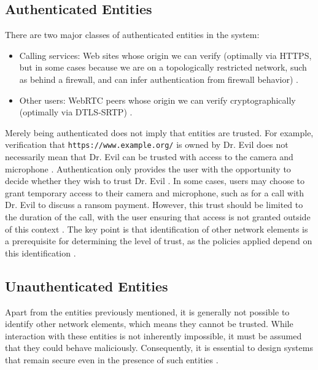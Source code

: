 \documentclass[conference]{IEEEtran}
\begin{document}
\subsection{Authenticated Entities}
There are two major classes of authenticated entities in the system:
\begin{itemize}
    \item Calling services: Web sites whose origin we can verify (optimally via HTTPS, but in some cases because we are on a topologically restricted 
    network, such as behind a firewall, and can infer authentication from firewall behavior) \cite{RFC8827}.
    \item Other users: WebRTC peers whose origin we can verify cryptographically (optimally via DTLS-SRTP) \cite{RFC8827}.
\end{itemize}

Merely being authenticated does not imply that entities are trusted. For example, verification that \texttt{https://www.example.org/}
is owned by Dr. Evil does not necessarily mean that Dr. Evil can be trusted with access to the camera and microphone \cite{RFC6973}. 
Authentication only provides the user with the opportunity to decide whether they wish to trust Dr. Evil \cite{RFC8827}. In some cases, 
users may choose to grant temporary access to their camera and microphone, such as for a call with Dr. Evil to discuss a ransom payment. 
However, this trust should be limited to the duration of the call, with the user ensuring that access is not granted outside of this context 
\cite{RFC8827}. The key point is that identification of other network elements is a prerequisite for determining the level of trust, 
as the policies applied depend on this identification \cite{RFC8827}.

 \subsection{Unauthenticated Entities} Apart from the entities previously mentioned, it is generally not possible to 
 identify other network elements, which means they cannot be trusted. While interaction with these entities is not inherently 
 impossible, it must be assumed that they could behave maliciously. Consequently, it is essential to design systems that remain 
 secure even in the presence of such entities \cite{RFC8827}.
\end{document}
